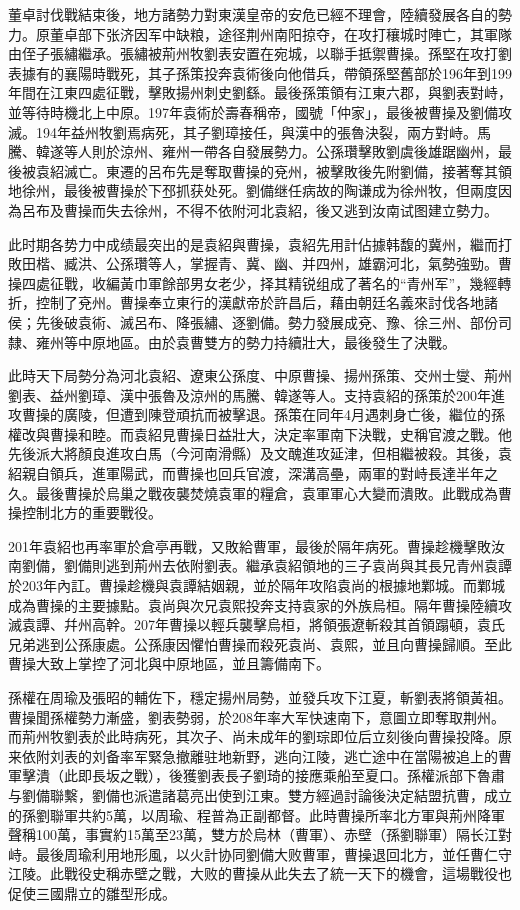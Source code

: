 董卓討伐戰結束後，地方諸勢力對東漢皇帝的安危已經不理會，陸續發展各自的勢力。原董卓部下张济因军中缺粮，途径荆州南阳掠夺，在攻打穰城时陣亡，其軍隊由侄子張繡繼承。張繡被荊州牧劉表安置在宛城，以聯手抵禦曹操。孫堅在攻打劉表據有的襄陽時戰死，其子孫策投奔袁術後向他借兵，帶領孫堅舊部於196年到199年間在江東四處征戰，擊敗揚州刺史劉繇。最後孫策領有江東六郡，與劉表對峙，並等待時機北上中原。197年袁術於壽春稱帝，國號「仲家」，最後被曹操及劉備攻滅。194年益州牧劉焉病死，其子劉璋接任，與漢中的張魯決裂，兩方對峙。馬騰、韓遂等人則於涼州、雍州一帶各自發展勢力。公孫瓚擊敗劉虞後雄踞幽州，最後被袁紹滅亡。東遷的呂布先是奪取曹操的兗州，被擊敗後先附劉備，接著奪其領地徐州，最後被曹操於下邳抓获处死。劉備继任病故的陶谦成为徐州牧，但兩度因為呂布及曹操而失去徐州，不得不依附河北袁紹，後又逃到汝南试图建立勢力。

此时期各势力中成绩最突出的是袁紹與曹操，袁紹先用計佔據韩馥的冀州，繼而打敗田楷、臧洪、公孫瓚等人，掌握青、冀、幽、并四州，雄霸河北，氣勢強勁。曹操四處征戰，收編黃巾軍餘部男女老少，择其精锐组成了著名的“青州军”，幾經轉折，控制了兗州。曹操奉立東行的漢獻帝於許昌后，藉由朝廷名義來討伐各地諸侯；先後破袁術、滅呂布、降張繡、逐劉備。勢力發展成兗、豫、徐三州、部份司隸、雍州等中原地區。由於袁曹雙方的勢力持續壯大，最後發生了決戰。

此時天下局勢分為河北袁紹、遼東公孫度、中原曹操、揚州孫策、交州士燮、荊州劉表、益州劉璋、漢中張魯及涼州的馬騰、韓遂等人。支持袁紹的孫策於200年進攻曹操的廣陵，但遭到陳登頑抗而被擊退。孫策在同年4月遇刺身亡後，繼位的孫權改與曹操和睦。而袁紹見曹操日益壯大，決定率軍南下決戰，史稱官渡之戰。他先後派大將顏良進攻白馬（今河南滑縣）及文醜進攻延津，但相繼被殺。其後，袁紹親自領兵，進軍陽武，而曹操也回兵官渡，深溝高壘，兩軍的對峙長達半年之久。最後曹操於烏巢之戰夜襲焚燒袁軍的糧倉，袁軍軍心大變而潰敗。此戰成為曹操控制北方的重要戰役。

201年袁紹也再率軍於倉亭再戰，又敗給曹軍，最後於隔年病死。曹操趁機擊敗汝南劉備，劉備則逃到荊州去依附劉表。繼承袁紹領地的三子袁尚與其長兄青州袁譚於203年內訌。曹操趁機與袁譚結姻親，並於隔年攻陷袁尚的根據地鄴城。而鄴城成為曹操的主要據點。袁尚與次兄袁熙投奔支持袁家的外族烏桓。隔年曹操陸續攻滅袁譚、幷州高幹。207年曹操以輕兵襲擊烏桓，將領張遼斬殺其首領蹋頓，袁氏兄弟逃到公孫康處。公孫康因懼怕曹操而殺死袁尚、袁熙，並且向曹操歸順。至此曹操大致上掌控了河北與中原地區，並且籌備南下。

孫權在周瑜及張昭的輔佐下，穩定揚州局勢，並發兵攻下江夏，斬劉表將領黃祖。曹操聞孫權勢力漸盛，劉表勢弱，於208年率大军快速南下，意圖立即奪取荆州。而荊州牧劉表於此時病死，其次子、尚未成年的劉琮即位后立刻後向曹操投降。原来依附刘表的刘备率军緊急撤離驻地新野，逃向江陵，逃亡途中在當陽被追上的曹軍擊潰（此即長坂之戰），後獲劉表長子劉琦的接應乘船至夏口。孫權派部下魯肅与劉備聯繫，劉備也派遣諸葛亮出使到江東。雙方經過討論後決定結盟抗曹，成立的孫劉聯軍共約5萬，以周瑜、程普為正副都督。此時曹操所率北方軍與荊州降軍聲稱100萬，事實約15萬至23萬，雙方於烏林（曹軍）、赤壁（孫劉聯軍）隔长江對峙。最後周瑜利用地形風，以火計协同劉備大败曹軍，曹操退回北方，並任曹仁守江陵。此戰役史稱赤壁之戰，大败的曹操从此失去了統一天下的機會，這場戰役也促使三國鼎立的雛型形成。

